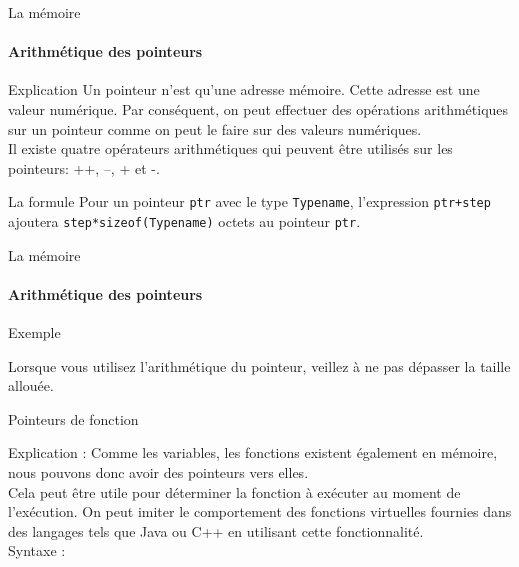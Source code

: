 	\begin{frame}{La mémoire}
		\framesubtitle{Arithmétique des pointeurs}
		\begin{block}{Explication}
			Un pointeur n'est qu'une adresse mémoire. Cette adresse est une valeur numérique. Par conséquent, on peut effectuer des opérations arithmétiques sur un pointeur comme on peut le faire sur des valeurs numériques.\\ 
			Il existe quatre opérateurs arithmétiques qui peuvent être utilisés sur les pointeurs: \alert{++}, \alert{--}, \alert{+} et \alert{-}.
		\end{block}
		\begin{block}{La formule}
			Pour un pointeur \texttt{ptr} avec le type \texttt{Typename}, l'expression \texttt{ptr+step} ajoutera \texttt{step*sizeof(Typename)} octets au pointeur \texttt{ptr}.
		\end{block}
	\end{frame}
  	
  	\begin{frame}{La mémoire}
  		\framesubtitle{Arithmétique des pointeurs}
  		\begin{exampleblock}{Exemple}
  			\ptrArithExmp
  		\end{exampleblock}
  	
  		\begin{alertblock}{Lorsque vous utilisez l'arithmétique du pointeur, veillez à ne pas dépasser la taille allouée.}
  		\end{alertblock}
  	\end{frame}


  	\begin{frame}{Pointeurs de fonction}
  		\begin{block}{Explication :}
  			Comme les variables, les fonctions existent également en mémoire, nous pouvons donc avoir des pointeurs vers elles. \\
  			Cela peut être utile pour déterminer la fonction à exécuter au moment de l'exécution. On peut imiter le comportement des fonctions virtuelles fournies dans des langages tels que Java ou C++ en utilisant cette fonctionnalité.\\
  			\alert{Syntaxe :}
  			\funcPtrSyntax
  		\end{block}
  	\end{frame}
  	
